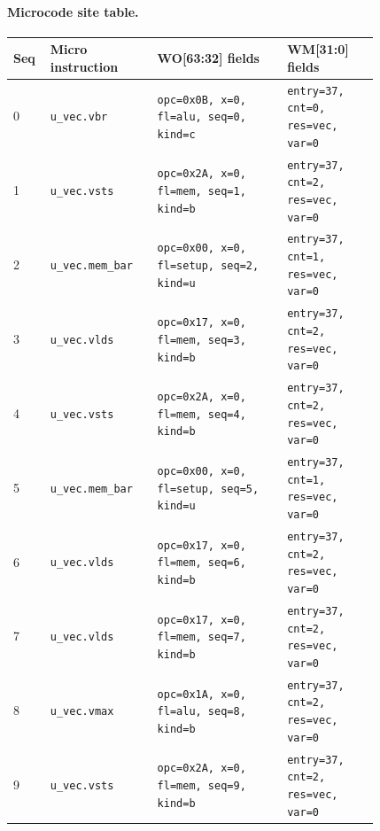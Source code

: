 \paragraph{Microcode site table.}
{\scriptsize
\begin{longtable}{@{}R{0.055\linewidth}L{0.23\linewidth}L{0.31\linewidth}L{0.22\linewidth}@{}}
\toprule
Seq & Micro instruction & WO[63:32] fields & WM[31:0] fields \\
 & \texttt{u\_vec.vbr} & \texttt{opc=0x0B, x=0, fl=alu, seq=0, kind=c} & \texttt{entry=37, cnt=0, res=vec, var=0} \\
1 & \texttt{u\_vec.vsts} & \texttt{opc=0x2A, x=0, fl=mem, seq=1, kind=b} & \texttt{entry=37, cnt=2, res=vec, var=0} \\
2 & \texttt{u\_vec.mem\_bar} & \texttt{opc=0x00, x=0, fl=setup, seq=2, kind=u} & \texttt{entry=37, cnt=1, res=vec, var=0} \\
3 & \texttt{u\_vec.vlds} & \texttt{opc=0x17, x=0, fl=mem, seq=3, kind=b} & \texttt{entry=37, cnt=2, res=vec, var=0} \\
4 & \texttt{u\_vec.vsts} & \texttt{opc=0x2A, x=0, fl=mem, seq=4, kind=b} & \texttt{entry=37, cnt=2, res=vec, var=0} \\
5 & \texttt{u\_vec.mem\_bar} & \texttt{opc=0x00, x=0, fl=setup, seq=5, kind=u} & \texttt{entry=37, cnt=1, res=vec, var=0} \\
6 & \texttt{u\_vec.vlds} & \texttt{opc=0x17, x=0, fl=mem, seq=6, kind=b} & \texttt{entry=37, cnt=2, res=vec, var=0} \\
7 & \texttt{u\_vec.vlds} & \texttt{opc=0x17, x=0, fl=mem, seq=7, kind=b} & \texttt{entry=37, cnt=2, res=vec, var=0} \\
8 & \texttt{u\_vec.vmax} & \texttt{opc=0x1A, x=0, fl=alu, seq=8, kind=b} & \texttt{entry=37, cnt=2, res=vec, var=0} \\
9 & \texttt{u\_vec.vsts} & \texttt{opc=0x2A, x=0, fl=mem, seq=9, kind=b} & \texttt{entry=37, cnt=2, res=vec, var=0} \\
\bottomrule
\end{longtable}
}
